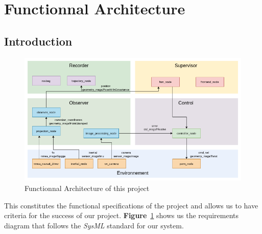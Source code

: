 \section{Functionnal Architecture}

\subsection{Introduction}

\begin{figure}[!ht]
    \begin{center}
        \includegraphics[scale=0.51]{Images/node_graph.png}
    \end{center}
    \caption{Functionnal Architecture of this project}
    \label{fig:requirement}
\end{figure}

This constitutes the functional specifications of the project and allows us to have criteria
for the success of our project. \textbf{Figure}~\ref{fig:requirement} shows us the requirements
diagram that follows the \textit{SysML} standard for our system.

\newpage